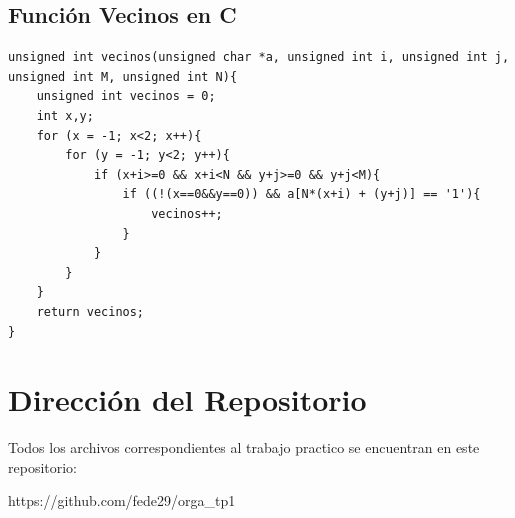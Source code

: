 \documentclass[11pt,a4paper]{article}
\begin{document}
\subsection{Función Vecinos en C}

\begin{lstlisting}[caption={vecinos.c},label={lst:codigoc}]
unsigned int vecinos(unsigned char *a, unsigned int i, unsigned int j, unsigned int M, unsigned int N){
	unsigned int vecinos = 0;
	int x,y;
	for (x = -1; x<2; x++){
		for (y = -1; y<2; y++){
			if (x+i>=0 && x+i<N && y+j>=0 && y+j<M){
				if ((!(x==0&&y==0)) && a[N*(x+i) + (y+j)] == '1'){
					vecinos++;
				}
			}
		}
	}
	return vecinos;
}
\end{lstlisting}

\section{Dirección del Repositorio}

Todos los archivos correspondientes al trabajo practico se encuentran en este repositorio:

	https://github.com/fede29/orga\_tp1
	
\end{document}
